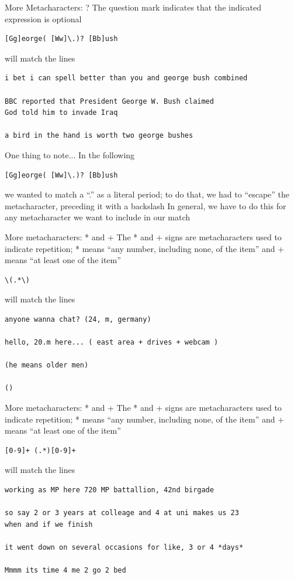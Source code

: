 \documentclass{beamer}
\begin{document}
\begin{frame}[fragile]{More Metacharacters: ?}
The question mark indicates that the indicated expression is optional
\begin{verbatim}
[Gg]eorge( [Ww]\.)? [Bb]ush
\end{verbatim}
will match the lines 
\begin{verbatim}
i bet i can spell better than you and george bush combined

BBC reported that President George W. Bush claimed 
God told him to invade Iraq 

a bird in the hand is worth two george bushes 
\end{verbatim}
\end{frame}

\begin{frame}[fragile]{One thing to note...}
In the following
\begin{verbatim}
[Gg]eorge( [Ww]\.)? [Bb]ush
\end{verbatim}
we wanted to match a ``.'' as a literal period; to do that, we had to
``escape'' the metacharacter, preceding it with a backslash In
general, we have to do this for any metacharacter we want to include
in our match
\end{frame}

\begin{frame}[fragile]{More metacharacters: * and +}
The * and + signs are metacharacters used to indicate repetition; * 
means ``any number, including none, of the item'' and + means ``at 
least one of the item''
\begin{verbatim}
\(.*\)
\end{verbatim}
will match the lines 
\begin{verbatim}
anyone wanna chat? (24, m, germany)

hello, 20.m here... ( east area + drives + webcam ) 

(he means older men) 

()
\end{verbatim}
\end{frame}

\begin{frame}[fragile]{More metacharacters: * and +}
The * and + signs are metacharacters used to indicate repetition; * 
means ``any number, including none, of the item'' and + means ``at 
least one of the item''
\begin{verbatim}
[0-9]+ (.*)[0-9]+
\end{verbatim}
will match the lines 
\begin{verbatim}
working as MP here 720 MP battallion, 42nd birgade 

so say 2 or 3 years at colleage and 4 at uni makes us 23 
when and if we finish

it went down on several occasions for like, 3 or 4 *days*

Mmmm its time 4 me 2 go 2 bed
\end{verbatim}
\end{frame}
\end{document}
